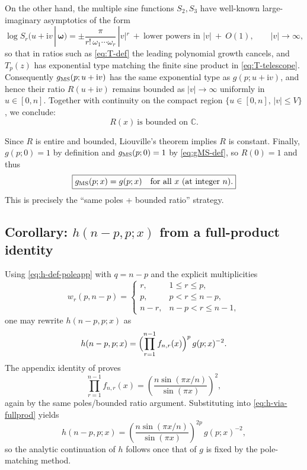 \documentclass[11pt]{article}
\newcommand{\ii}{\mathrm{i}}
\begin{document}
  On the other hand, the multiple sine functions $S_{2},S_{3}$ have well-known large-imaginary
  asymptotics of the form
  \begin{equation}
    \log S_{r}(u+\ii v\,|\,\boldsymbol{\omega}) = \pm \frac{\pi}{r!\,\omega_{1}\cdots
    \omega_{r}}\,|v|^{r}\ +\ \text{lower powers in }|v| \ +\ O(1), \qquad |v|\to
    \infty,
  \end{equation}
  so that in ratios such as \eqref{eq:T-def} the leading polynomial growth
  cancels, and $T_{p}(z)$ has exponential type matching the finite sine product in
  \eqref{eq:T-telescope}. Consequently $g_{\rm MS}(p;u+\ii v)$ has the same exponential
  type as $g(p;u+\ii v)$, and hence their ratio $R(u+\ii v)$ remains bounded as
  $|v|\to\infty$ uniformly in $u\in[0,n]$. Together with continuity on the compact
  region $\{u\in[0,n],\,|v|\le V\}$, we conclude:
  \begin{equation}
    \boxed{R(x)\ \text{is bounded on }\mathbb{C}.}
  \end{equation}

  Since $R$ is entire and bounded, Liouville's theorem implies $R$ is constant.
  Finally, $g(p;0)=1$ by definition and $g_{\rm MS}(p;0)=1$ by \eqref{eq:gMS-def},
  so $R(0)=1$ and thus
  \begin{equation}
    \boxed{g_{\rm MS}(p;x)=g(p;x)\quad \text{for all }x\ \text{(at integer }n\text{).}}
  \end{equation}
  This is precisely the ``same poles + bounded ratio'' strategy.

  \subsection*{Corollary: $h(n-p,p;x)$ from a full-product identity}

  Using \eqref{eq:h-def-poleapp} with $q=n-p$ and the explicit multiplicities
  \begin{equation}
    w_{r}(p,n-p)=
    \begin{cases}
      r,   & 1\le r\le p,  \\
      p,   & p<r\le n-p,   \\
      n-r, & n-p<r\le n-1,
    \end{cases}
  \end{equation}
  one may rewrite $h(n-p,p;x)$ as
  \begin{equation}
    h(n-p,p;x)=\Bigl(\prod_{r=1}^{n-1}f_{n,r}(x)\Bigr)^{p}\,g(p;x)^{-2}. \label{eq:h-via-fullprod}
  \end{equation}
  The appendix identity of 
  \cite{Lashkari_2016}
  proves
  \begin{equation}
    \prod_{r=1}^{n-1}f_{n,r}(x)=\left(\frac{n\sin(\pi x/n)}{\sin(\pi x)}\right)^{2}
    ,
  \end{equation}
  again by the same poles/bounded ratio argument. Substituting into \eqref{eq:h-via-fullprod}
  yields
  \begin{equation}
    \boxed{ h(n-p,p;x) = \left(\frac{n\sin(\pi x/n)}{\sin(\pi x)}\right)^{2p}\,g(p;x)^{-2}, }
  \end{equation}
  so the analytic continuation of $h$ follows once that of $g$ is fixed by the
  pole-matching method.



\end{document}
